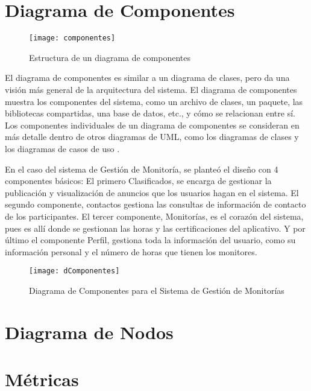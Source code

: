 \newpage

\section{Diagrama de Componentes}
\begin{figure}[H]
	\centering
	\texttt{[image: componentes]}
	\centering
	\caption{Estructura de un diagrama de componentes}
	\label{fig:componentes}
\end{figure}

El diagrama de componentes es similar a un diagrama de clases, pero da una visión más
general de la arquitectura del sistema. El diagrama de componentes muestra los componentes
del sistema, como un archivo de clases, un paquete, las bibliotecas compartidas, una base
de datos, etc., y cómo se relacionan entre sí. Los componentes individuales de un diagrama de
componentes se consideran en más detalle dentro de otros diagramas de UML, como los
diagramas de clases y los diagramas de casos de uso \cite{Kendall_2005}.

En el caso del sistema de Gestión de Monitoría, se planteó el diseño con 4 componentes básicos: El primero Clasificados, se encarga de gestionar la publicación y visualización de anuncios que los usuarios hagan en el sistema. El segundo componente, contactos gestiona las consultas de información de contacto de los participantes. El tercer componente, Monitorías, es el corazón del sistema, pues es allí donde se gestionan las horas y las certificaciones del aplicativo. Y por último el componente Perfil, gestiona toda la información del usuario, como su información personal y el número de horas que tienen los monitores.

\begin{figure}[H]
	\centering
	\texttt{[image: dComponentes]}
	\centering
	\caption{Diagrama de Componentes para el Sistema de Gestión de Monitorías}
	\label{fig:dcomponentes}
\end{figure}
\newpage


\section{Diagrama de Nodos}

\newpage


\section{Métricas}

